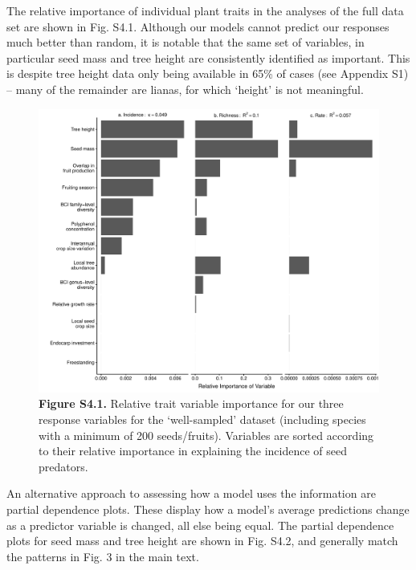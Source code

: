 \documentclass[11pt]{article}
\begin{document}
The relative importance of individual plant traits in the analyses of the full data set are shown in Fig. S4.1. Although our models cannot predict our responses much better than random, it is notable that the same set of variables, in particular seed mass and tree height are consistently identified as important. This is despite tree height data only being available in 65\% of cases (see Appendix S1) – many of the remainder are lianas, for which ‘height’ is not meaningful. 



\begin{figure}[H]
\centering\includegraphics[width=\textwidth]{../Figures/VarImpPlot.pdf} 
\caption[]{\textbf{Figure S4.1.} Relative trait variable importance for our three response variables for the ‘well-sampled' dataset (including species with a minimum of 200 seeds/fruits). Variables are sorted according to their relative importance in explaining the incidence of seed predators. }
\end{figure}


An alternative approach to assessing how a model uses the information are partial dependence plots. These display how a model’s average predictions change as a predictor variable is changed, all else being equal. The partial dependence plots for seed mass and tree height are shown in Fig. S4.2, and generally match the patterns in Fig. 3 in the main text. 
\end{document}
